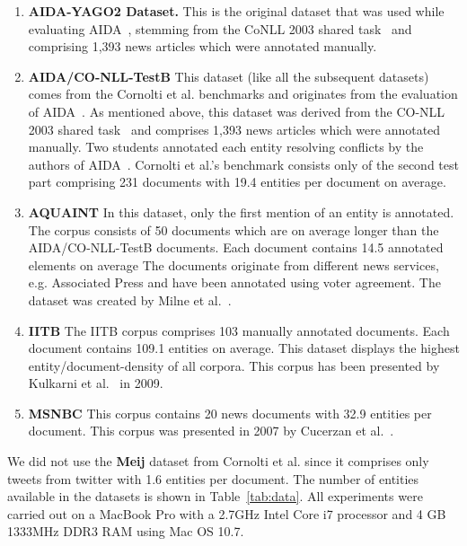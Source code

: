 \begin{enumerate}
\item \textbf{AIDA-YAGO2 Dataset.}
This is the original dataset that was used while evaluating AIDA~\cite{AIDA}, stemming from the CoNLL 2003 shared task~\cite{conll2003} and comprising 1,393 news articles which were annotated manually. %

\item  \textbf{AIDA/CO-NLL-TestB} This dataset (like all the subsequent datasets) comes from the Cornolti et al. benchmarks and originates from the evaluation of AIDA~\cite{AIDA}. 
As mentioned above, this dataset was derived from the CO-NLL 2003 shared task~\cite{conll2003} and comprises 1,393 news articles which were annotated manually. Two students annotated each entity resolving conflicts by the authors of AIDA~\cite{AIDA}. Cornolti et al.'s benchmark consists only of the second test part comprising 231 documents with 19.4 entities per document on average.

\item \textbf{AQUAINT} In this dataset, only the first mention of an entity is annotated. The corpus consists of 50 documents which are on average longer than the AIDA/CO-NLL-TestB documents. Each document contains 14.5 annotated elements on average
The documents originate from different news services, e.g. Associated Press and have been annotated using voter agreement.
The dataset was created by Milne et al.~\cite{milne2008learning}.

\item \textbf{IITB} The IITB corpus comprises 103 manually annotated documents. Each document contains 109.1 entities on average.
This dataset displays the highest entity/document-density of all corpora.
This corpus has been presented by Kulkarni et al.~\cite{kulkarni2009collective} in 2009.

\item \textbf{MSNBC} This corpus contains 20 news documents with 32.9 entities per document. This corpus was presented in 2007 by Cucerzan et al.~\cite{Cucerzan07}.
\end{enumerate}

We did not use the \textbf{Meij} dataset from Cornolti et al. since it comprises only tweets from twitter with 1.6 entities per document. The number of entities available in the datasets is shown in Table~\ref{tab:data}.
All experiments were carried out on a MacBook Pro with a 2.7GHz Intel Core i7 processor and 4 GB 1333MHz DDR3 RAM using Mac OS 10.7. 


